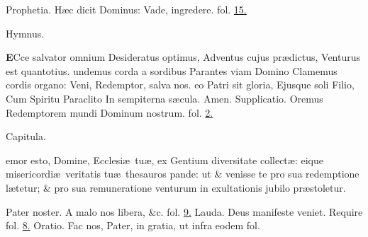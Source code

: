 \documentclass[letter,11pt]{book}
\begin{document}
\begin{multicols}{2}
\newline \color{Red} Prophetia. \color{black} H\ae c dicit Dominus: Vade, ingredere. \color{Red} fol. \color{black} \hyperlink{page.15}{15.}
\vspace{-.75em} \begin{center} \color{Red} Hymnus. \end{center} \vspace{-.25em}
\lettrine[lines=2]{\bfseries \color{Red} E}{}Cce salvator omnium
\newline Desideratus optimus,
\newline \indent Adventus cujus pr\ae dictus,
\newline \indent Venturus est quantotius.
undemus corda a sordibus
\newline \indent Parantes viam Domino
\newline \indent Clamemus cordis organo:
\newline \indent Veni, Redemptor, salva nos.
eo Patri sit gloria,
\newline \indent Ejusque soli Filio,
\newline \indent Cum Spiritu Paraclito
\newline \indent In sempiterna s\ae cula. Amen.
\newline \color{Red} Supplicatio. \color{black} Oremus Redemptorem mundi Dominum nostrum. \color{Red} fol. \color{black} \hyperlink{Supplicatio}{2.}
\vspace{-.25em} \begin{center} \color{Red} Capitula. \end{center} \vspace{-.25em}
\par {}emor esto, Domine, Ecclesi\ae \ tu\ae , ex Gentium diversitate collect\ae : eique misericordi\ae \ veritatis tu\ae \ thesauros pande: ut \& venisse te pro sua redemptione l\ae tetur; \& pro sua remuneratione venturum in exultationis jubilo pr\ae stoletur. 
\par Pater noster. A malo nos libera, \&c. \color{Red} fol. \color{black} \hyperlink{page.9}{9.}
\newline \color{Red} Lauda. \color{black} Deus manifeste veniet. \color{Red} Require fol. \color{black} \hyperlink{page.8}{8.}
\newline \color{Red} Oratio. \color{black} Fac nos, Pater, in gratia, \color{Red} ut infra eodem fol. \color{black}

\end{multicols}
\end{document}
